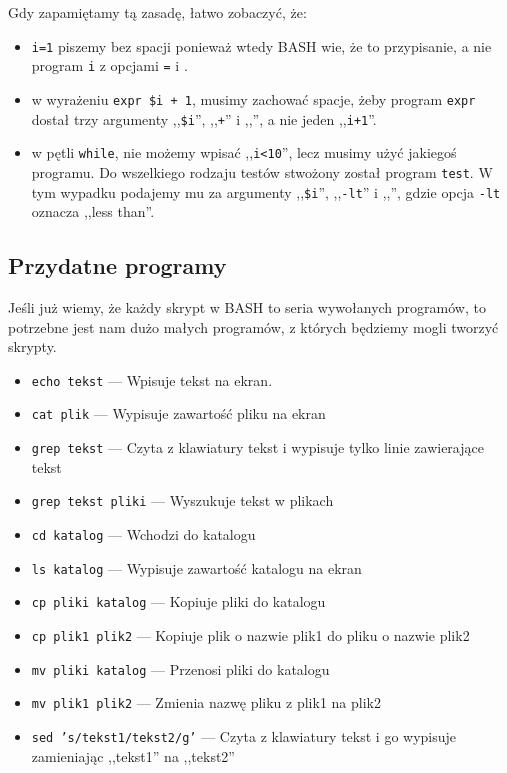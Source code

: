 \documentclass{instrukcja}
\begin{document}
Gdy zapamiętamy tą zasadę, łatwo zobaczyć, że:
\begin{itemize}
\item {\tt\red i=1} piszemy bez spacji ponieważ wtedy BASH wie, że to przypisanie, a nie program {\tt\red i} z opcjami {\tt\green =} i {\tt{}}. 
\item w wyrażeniu {\tt {\red expr} {\green \$i + 1}}, musimy zachować spacje, żeby program {\tt\red expr} dostał trzy argumenty ,,{\tt\green\$i}'', ,,{\tt\green +}'' i ,,{\tt{}}'', a nie jeden ,,{\tt\green i+1}''.
\item w pętli {\tt while}, nie możemy wpisać ,,{\tt i<10}'', lecz musimy użyć jakiegoś programu. Do wszelkiego rodzaju testów stwożony został program {\tt\red test}. W tym wypadku podajemy mu za argumenty ,,{\tt\green\$i}'', ,,{\tt\green -lt}'' i ,,{\tt{}}'', gdzie opcja {\tt\green -lt} oznacza ,,less than''.
\end{itemize}

\subsection{Przydatne programy}
Jeśli już wiemy, że każdy skrypt w BASH to seria wywołanych programów, to potrzebne jest nam dużo małych programów, z których będziemy mogli tworzyć skrypty.
\begin{itemize}
\item {\tt{\red echo} {\green tekst}} --- Wpisuje {\green tekst} na ekran.
\item {\tt{\red cat} {\green plik}} --- Wypisuje zawartość {\green plik}u na ekran
\item {\tt{\red grep} {\green tekst}} --- Czyta z klawiatury tekst i wypisuje tylko linie zawierające {\green tekst}
\item {\tt{\red grep} {\green tekst pliki}} --- Wyszukuje {\green tekst} w {\green plik}ach
\item {\tt{\red cd} {\green katalog}} --- Wchodzi do {\green katalogu}
\item {\tt{\red ls} {\green katalog}} --- Wypisuje zawartość {\green katalog}u na ekran
\item {\tt{\red cp} {\green pliki katalog}} --- Kopiuje {\green pliki} do {\green katalog}u
\item {\tt{\red cp} {\green plik1 plik2}} --- Kopiuje plik o nazwie {\green plik1} do pliku o nazwie {\green plik2}
\item {\tt{\red mv} {\green pliki katalog}} --- Przenosi {\green pliki} do {\green katalog}u
\item {\tt{\red mv} {\green plik1 plik2}} --- Zmienia nazwę pliku z {\green plik1} na {\green plik2}
\item {\tt{\red sed} {\green 's/tekst1/tekst2/g'}} --- Czyta z klawiatury tekst i go wypisuje zamieniając ,,{\green tekst1}'' na ,,{\green tekst2}''
\end{itemize}
\end{document}
